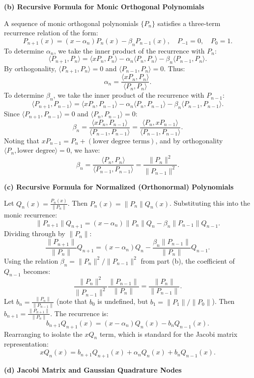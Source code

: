 \begin{solution}
\textbf{(b) Recursive Formula for Monic Orthogonal Polynomials}

A sequence of monic orthogonal polynomials $\{P_n\}$ satisfies a three-term recurrence relation of the form:
\[ P_{n+1}(x) = (x - \alpha_n) P_n(x) - \beta_n P_{n-1}(x), \quad P_{-1} = 0, \quad P_0 = 1. \]
To determine $\alpha_n$, we take the inner product of the recurrence with $P_n$:
\[ \langle P_{n+1}, P_n \rangle = \langle x P_n, P_n \rangle - \alpha_n \langle P_n, P_n \rangle - \beta_n \langle P_{n-1}, P_n \rangle. \]
By orthogonality, $\langle P_{n+1}, P_n \rangle = 0$ and $\langle P_{n-1}, P_n \rangle = 0$. Thus:
\[ \alpha_n = \frac{\langle x P_n, P_n \rangle}{\langle P_n, P_n \rangle}. \]
To determine $\beta_n$, we take the inner product of the recurrence with $P_{n-1}$:
\[ \langle P_{n+1}, P_{n-1} \rangle = \langle x P_n, P_{n-1} \rangle - \alpha_n \langle P_n, P_{n-1} \rangle - \beta_n \langle P_{n-1}, P_{n-1} \rangle. \]
Since $\langle P_{n+1}, P_{n-1} \rangle = 0$ and $\langle P_n, P_{n-1} \rangle = 0$:
\[ \beta_n = \frac{\langle x P_n, P_{n-1} \rangle}{\langle P_{n-1}, P_{n-1} \rangle} = \frac{\langle P_n, x P_{n-1} \rangle}{\langle P_{n-1}, P_{n-1} \rangle}. \]
Noting that $x P_{n-1} = P_n + (\text{lower degree terms})$, and by orthogonality $\langle P_n, \text{lower degree} \rangle = 0$, we have:
\[ \beta_n = \frac{\langle P_n, P_n \rangle}{\langle P_{n-1}, P_{n-1} \rangle} = \frac{\|P_n\|^2}{\|P_{n-1}\|^2}. \]

\textbf{(c) Recursive Formula for Normalized (Orthonormal) Polynomials}

Let $Q_n(x) = \frac{P_n(x)}{\|P_n\|}$. Then $P_n(x) = \|P_n\| Q_n(x)$. Substituting this into the monic recurrence:
\[ \|P_{n+1}\| Q_{n+1} = (x - \alpha_n) \|P_n\| Q_n - \beta_n \|P_{n-1}\| Q_{n-1}. \]
Dividing through by $\|P_n\|$:
\[ \frac{\|P_{n+1}\|}{\|P_n\|} Q_{n+1} = (x - \alpha_n) Q_n - \frac{\beta_n \|P_{n-1}\|}{\|P_n\|} Q_{n-1}. \]
Using the relation $\beta_n = \|P_n\|^2 / \|P_{n-1}\|^2$ from part (b), the coefficient of $Q_{n-1}$ becomes:
\[ \frac{\|P_n\|^2}{\|P_{n-1}\|^2} \frac{\|P_{n-1}\|}{\|P_n\|} = \frac{\|P_n\|}{\|P_{n-1}\|}. \]
Let $b_n = \frac{\|P_n\|}{\|P_{n-1}\|}$ (note that $b_0$ is undefined, but $b_1 = \|P_1\|/\|P_0\|$). Then $b_{n+1} = \frac{\|P_{n+1}\|}{\|P_n\|}$. The recurrence is:
\[ b_{n+1} Q_{n+1}(x) = (x - \alpha_n) Q_n(x) - b_n Q_{n-1}(x). \]
Rearranging to isolate the $x Q_n$ term, which is standard for the Jacobi matrix representation:
\[ x Q_n(x) = b_{n+1} Q_{n+1}(x) + \alpha_n Q_n(x) + b_n Q_{n-1}(x). \]

\textbf{(d) Jacobi Matrix and Gaussian Quadrature Nodes}


\end{solution}
